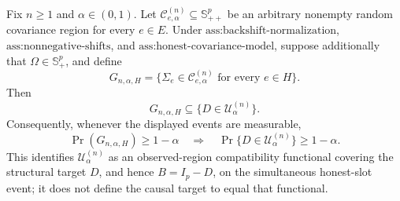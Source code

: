 Fix \(n\geq1\) and \(\alpha\in(0,1)\). Let \(\mathcal C^{(n)}_{e,\alpha}\subseteq\mathbb S_{++}^{p}\) be an arbitrary nonempty random covariance region for every \(e\in E\). Under \(\text{ass:backshift-normalization}\), \(\text{ass:nonnegative-shifts}\), and \(\text{ass:honest-covariance-model}\), suppose additionally that \(\Omega\in\mathbb S_+^p\), and define
\[
G_{n,\alpha,H}
=\{\Sigma_e\in\mathcal C^{(n)}_{e,\alpha}\text{ for every }e\in H\}.
\]
Then
\[
G_{n,\alpha,H}\subseteq\{D\in\mathcal U^{(n)}_\alpha\}.
\]
Consequently, whenever the displayed events are measurable,
\[
\Pr(G_{n,\alpha,H})\geq1-\alpha
\quad\Longrightarrow\quad
\Pr\{D\in\mathcal U^{(n)}_\alpha\}\geq1-\alpha.
\]
This identifies \(\mathcal U^{(n)}_\alpha\) as an observed-region compatibility functional covering the structural target \(D\), and hence \(B=I_p-D\), on the simultaneous honest-slot event; it does not define the causal target to equal that functional.